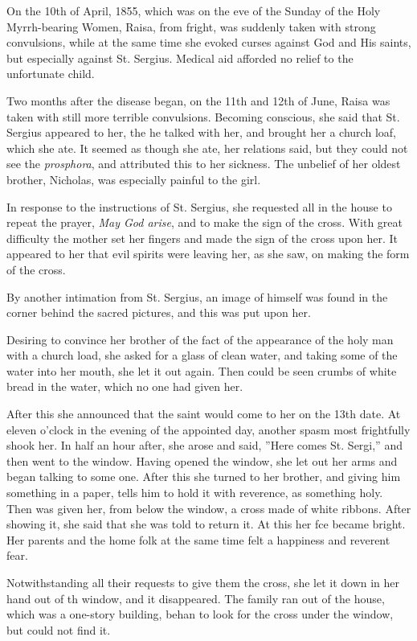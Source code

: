 On the 10th of April, 1855, which was on the eve of the Sunday of the Holy Myrrh-bearing Women, Raisa, from fright, was suddenly taken with strong convulsions, while at the same time she evoked curses against God and His saints, but especially against St. Sergius. Medical aid afforded no relief to the unfortunate child.

Two months after the disease began, on the 11th and 12th of June, Raisa was taken with still more terrible convulsions. Becoming conscious, she said that St. Sergius appeared to her, the he talked with her, and brought her a church loaf, which she ate. It seemed as though she ate, her relations said, but they could not see the \textit{prosphora}, and attributed this to her sickness. The unbelief of her oldest brother, Nicholas, was especially painful to the girl.

In response to the instructions of St. Sergius, she requested all in the house to repeat the prayer, \textit{May God arise}, and to make the sign of the cross. With great difficulty the mother set her fingers and made the sign of the cross upon her. It appeared to her that evil spirits were leaving her, as she saw, on making the form of the cross.

By another intimation from St. Sergius, an image of himself was found in the corner behind the sacred pictures, and this was put upon her.

Desiring to convince her brother of the fact of the appearance of the holy man with a church load, she asked for a glass of clean water, and taking some of the water into her mouth, she let it out again. Then could be seen crumbs of white bread in the water, which no one had given her.

After this she announced that the saint would come to her on the 13th date. At eleven o'clock in the evening of the appointed day, another spasm most frightfully shook her. In half an hour after, she arose and said, ''Here comes St. Sergi,'' and then went to the window. Having opened the window, she let out her arms and began talking to some one. After this she turned to her brother, and giving him something in a paper, tells him to hold it with reverence, as something holy. Then was given her, from below the window, a cross made of white ribbons. After showing it, she said that she was told to return it. At this her fce became bright. Her parents and the home folk at the same time felt a happiness and reverent fear.

Notwithstanding all their requests to give them the cross, she let it down in her hand out of th window, and it disappeared. The family ran out of the house, which was a one-story building, behan to look for the cross under the window, but could not find it.


